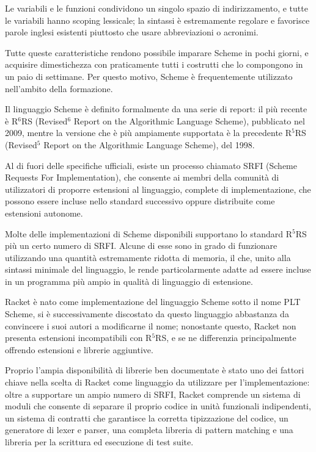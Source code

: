 Le variabili e le funzioni condividono un singolo spazio di
indirizzamento, e tutte le variabili hanno scoping lessicale; la sintassi
\`e estremamente regolare e favorisce parole inglesi esistenti piuttosto
che usare abbreviazioni o acronimi.

Tutte queste caratteristiche rendono possibile imparare Scheme in pochi
giorni, e acquisire dimestichezza con praticamente tutti i costrutti che
lo compongono in un paio di settimane. Per questo motivo, Scheme \`e
frequentemente utilizzato nell'ambito della formazione.

Il linguaggio Scheme \`e definito formalmente da una serie di report: il
pi\`u recente \`e R$^{6}$RS (Revised$^{6}$ Report on the Algorithmic
Language Scheme\cite{r6rs}), pubblicato nel 2009, mentre la versione che
\`e pi\`u ampiamente supportata \`e la precedente R$^{5}$RS (Revised$^{5}$
Report on the Algorithmic Language Scheme\cite{r5rs}), del 1998.

Al di fuori delle specifiche ufficiali, esiste un processo chiamato
SRFI (Scheme Requests For Implementation), che consente ai membri della
comunit\`a di utilizzatori di proporre estensioni al linguaggio, complete
di implementazione, che possono essere incluse nello standard successivo
oppure distribuite come estensioni autonome.

Molte delle implementazioni di Scheme disponibili supportano lo
standard R$^{5}$RS pi\`u un certo numero di SRFI. Alcune di esse sono
in grado di funzionare utilizzando una quantit\`a estremamente ridotta
di memoria, il che, unito alla sintassi minimale del linguaggio, le
rende particolarmente adatte ad essere incluse in un programma pi\`u
ampio in qualit\`a di linguaggio di estensione.

Racket \`e nato come implementazione del linguaggio Scheme sotto il nome
PLT Scheme, si \`e successivamente discostato da questo linguaggio
abbastanza da convincere i suoi autori a modificarne il nome; nonostante
questo, Racket non presenta estensioni incompatibili con R$^{5}$RS, e
se ne differenzia principalmente offrendo estensioni e librerie
aggiuntive.

Proprio l'ampia disponibilit\`a di librerie ben documentate \`e stato
uno dei fattori chiave nella scelta di Racket come linguaggio da
utilizzare per l'implementazione: oltre a supportare un ampio numero
di SRFI, Racket comprende un sistema di moduli che consente di separare
il proprio codice in unit\`a funzionali indipendenti, un sistema di
contratti che garantisce la corretta tipizzazione del codice, un
generatore di lexer e parser, una completa libreria di pattern matching
e una libreria per la scrittura ed esecuzione di test suite.


